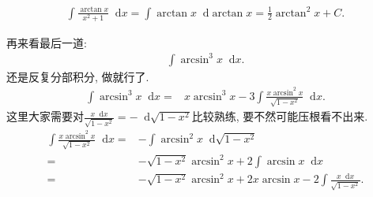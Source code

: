 \documentclass{ctexbook}
\newcommand*{\dif}{\mathop{}\!\mathrm{d}}
\begin{document}
{\begin{align*}
\int\frac{\arctan{x}}{x^{2}+1}\dif{x}=\int\arctan{x}\dif{\arctan{x}}=\frac{1}{2}\arctan^{2}{x}+C
.\end{align*}\par
再来看最后一道: 
\begin{align*}
\int\arcsin^{3}{x}\dif{x}
.\end{align*}
还是反复分部积分, 做就行了. 
\begin{align*}
\int\arcsin^{3}{x}\dif{x}={}&x\arcsin^{3}{x}-3\int\frac{x\arcsin^{2}{x}}{\sqrt{1-x^{2}}}\dif{x}
.\end{align*}
这里大家需要对$\frac{x\dif{x}}{\sqrt{1-x^{2}}}=-\dif{\sqrt{1-x^{2}}}$比较熟练, 要不然可能压根看不出来. 
\begin{align*}
\int\frac{x\arcsin^{2}{x}}{\sqrt{1-x^{2}}}\dif{x}={}&-\int\arcsin^{2}{x}\dif{\sqrt{1-x^{2}}}\\
={}&-\sqrt{1-x^{2}}\arcsin^{2}{x}+2\int\arcsin{x}\dif{x}\\
={}&-\sqrt{1-x^{2}}\arcsin^{2}{x}+2x\arcsin{x}-2\int\frac{x\dif{x}}{\sqrt{1-x^{2}}}
.\end{align*}\par
}
\end{document}
